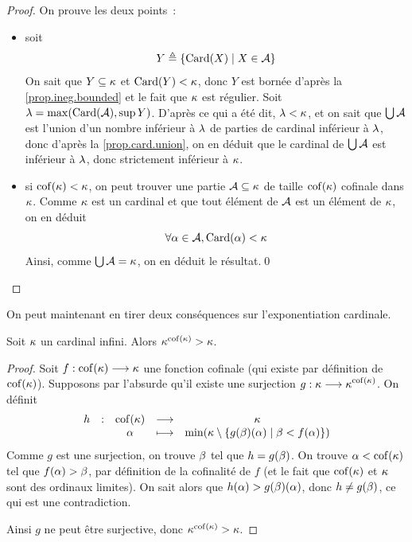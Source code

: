 \begin{proof}
  On prouve les deux points~:
  \begin{itemize}
  \item soit
    \[Y \triangleq \left\{ \operatorname{Card}(X) \;\middle\vert\; X \in \mathcal A \right\}\]
    On sait que $Y\subseteq \kappa$ et $\operatorname{Card}(Y) < \kappa$, donc $Y$ est bornée
    d'après la \cref{prop.ineg.bounded} et le fait que $\kappa$ est régulier.
    Soit $\lambda = \max(\operatorname{Card}(\mathcal A), \sup Y)$. D'après ce qui a été dit,
    $\lambda < \kappa$, et on sait que $\bigcup \mathcal A$ est l'union d'un
    nombre inférieur à $\lambda$ de parties de cardinal inférieur à $\lambda$,
    donc d'après la \cref{prop.card.union}, on en déduit que le cardinal de
    $\bigcup \mathcal A$ est inférieur à $\lambda$, donc strictement inférieur
    à $\kappa$.
  \item si $\operatorname{cof}(\kappa) < \kappa$, on peut trouver une partie
    $\mathcal A\subseteq \kappa$ de taille $\operatorname{cof}(\kappa)$ cofinale dans
    $\kappa$. Comme $\kappa$ est un cardinal et que tout élément de $\mathcal A$
    est un élément de $\kappa$, on en déduit
    \[\forall \alpha \in \mathcal A, \operatorname{Card}(\alpha) < \kappa\]
    Ainsi, comme $\bigcup \mathcal A = \kappa$, on en déduit le résultat.\qed
  \end{itemize}
\end{proof}

\noindent
On peut maintenant en tirer deux conséquences sur l'exponentiation cardinale.

\begin{proposition}
  Soit $\kappa$ un cardinal infini. Alors $\kappa^{\operatorname{cof}(\kappa)} > \kappa$.
\end{proposition}

\begin{proof}
  Soit $f : \displaystyle \operatorname{cof}(\kappa) \longrightarrow \kappa$ une fonction cofinale (qui existe
  par définition de $\operatorname{cof}(\kappa)$). Supposons par l'absurde qu'il existe une
  surjection $g : \displaystyle \kappa \longrightarrow \kappa^{\operatorname{cof}(\kappa)}$. On définit
  \[
  \makeFun{h}{\cof(\varCk)}{\varCk}{\varOa}
          {\min(\varCk\setminus\compr{g(\varOb)(\varOa)}{\varOb < f(\varOa)})}\]
  Comme $g$ est une surjection, on trouve $\beta$ tel que $h = g(\beta)$. On
  trouve $\alpha < \operatorname{cof}(\kappa)$ tel que $f(\alpha) > \beta$, par définition de
  la cofinalité de $f$ (et le fait que $\operatorname{cof}(\kappa)$ et $\kappa$ sont des
  ordinaux limites). On sait alors que $h(\alpha) > g(\beta)(\alpha)$, donc
  $h\neq g(\beta)$, ce qui est une contradiction.

  Ainsi $g$ ne peut être surjective, donc $\kappa^{\operatorname{cof}(\kappa)} > \kappa$.
\end{proof}

